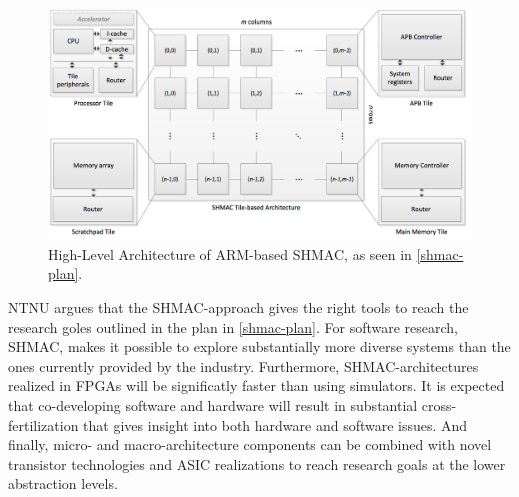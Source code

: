 \begin{figure}[htb]
    \centering
    \includegraphics[width=1.0\textwidth]{Figures/Heterogeneous/SHMAC}
    \caption{High-Level Architecture of ARM-based SHMAC, as seen in \ref{shmac-plan}.}
    \label{fig:shmac}
\end{figure}

NTNU argues that the SHMAC-approach gives the right tools to reach the research goles outlined in the plan in \ref{shmac-plan}.
For software research, SHMAC, makes it possible to explore substantially more diverse systems than the ones currently provided by the industry.
Furthermore, SHMAC-architectures realized in FPGAs will be significatly faster than using simulators.
It is expected that co-developing software and hardware will result in substantial cross-fertilization that gives insight into both hardware and software issues.
And finally, micro- and macro-architecture components can be combined with novel transistor technologies and ASIC realizations to reach research goals at the lower abstraction levels.


